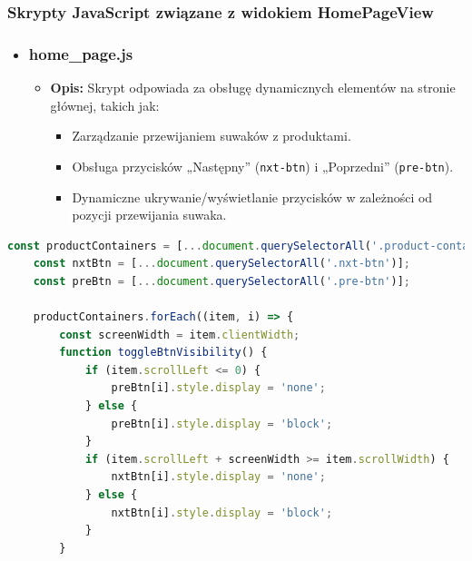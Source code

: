 \documentclass[12pt,a4paper,oneside]{article}
\theoremstyle{definition}
\numberwithin{equation}{section}
\begin{document}
\begin{itemize}
        \subsubsection{Skrypty JavaScript związane z widokiem HomePageView}
        \begin{itemize}
            \item \subsubsection*{home\_page.js}
            \begin{itemize}
                \item \textbf{Opis:} Skrypt odpowiada za obsługę dynamicznych elementów na stronie głównej, takich jak:
                \begin{itemize}
                    \item Zarządzanie przewijaniem suwaków z produktami.
                    \item Obsługa przycisków „Następny” (\texttt{nxt-btn}) i „Poprzedni” (\texttt{pre-btn}).
                    \item Dynamiczne ukrywanie/wyświetlanie przycisków w zależności od pozycji przewijania suwaka.
                \end{itemize}
            \end{itemize}
        \end{itemize}
        \begin{lstlisting}[language=JavaScript, caption=Skrypt \texttt{home\_page.js}]
    const productContainers = [...document.querySelectorAll('.product-container')];
    const nxtBtn = [...document.querySelectorAll('.nxt-btn')];
    const preBtn = [...document.querySelectorAll('.pre-btn')];

    productContainers.forEach((item, i) => {
        const screenWidth = item.clientWidth;
        function toggleBtnVisibility() {
            if (item.scrollLeft <= 0) {
                preBtn[i].style.display = 'none';
            } else {
                preBtn[i].style.display = 'block';
            }
            if (item.scrollLeft + screenWidth >= item.scrollWidth) {
                nxtBtn[i].style.display = 'none';
            } else {
                nxtBtn[i].style.display = 'block';
            }
        }


\end{lstlisting}
\end{itemize}
\end{document}
